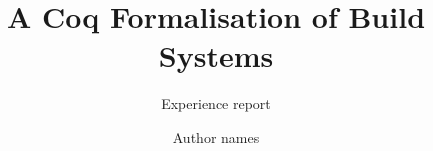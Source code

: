 \documentclass[sigplan,review]{acmart}\settopmatter{printfolios=true,printccs=false,printacmref=false}
\begin{document}
\title[]{A Coq Formalisation of Build Systems}         %
\subtitle{Experience report}                     %


\author{Author names}


\end{document}
